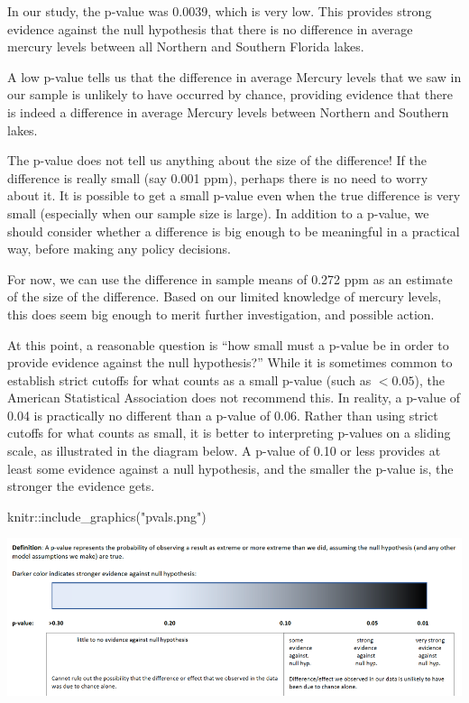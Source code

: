 \documentclass[
  letterpaper,
  DIV=11,
  numbers=noendperiod]{scrreprt}
\newenvironment{Shaded}{\begin{snugshade}}{\end{snugshade}}
\newcommand{\FunctionTok}[1]{\textcolor[rgb]{0.28,0.35,0.67}{#1}}
\newcommand{\NormalTok}[1]{\textcolor[rgb]{0.00,0.23,0.31}{#1}}
\newcommand{\SpecialCharTok}[1]{\textcolor[rgb]{0.37,0.37,0.37}{#1}}
\newcommand{\StringTok}[1]{\textcolor[rgb]{0.13,0.47,0.30}{#1}}
\begin{document}
In our study, the p-value was 0.0039, which is very low. This provides
strong evidence against the null hypothesis that there is no difference
in average mercury levels between all Northern and Southern Florida
lakes.

A low p-value tells us that the difference in average Mercury levels
that we saw in our sample is unlikely to have occurred by chance,
providing evidence that there is indeed a difference in average Mercury
levels between Northern and Southern lakes.

The p-value does not tell us anything about the size of the difference!
If the difference is really small (say 0.001 ppm), perhaps there is no
need to worry about it. It is possible to get a small p-value even when
the true difference is very small (especially when our sample size is
large). In addition to a p-value, we should consider whether a
difference is big enough to be meaningful in a practical way, before
making any policy decisions.

For now, we can use the difference in sample means of 0.272 ppm as an
estimate of the size of the difference. Based on our limited knowledge
of mercury levels, this does seem big enough to merit further
investigation, and possible action.

At this point, a reasonable question is ``how small must a p-value be in
order to provide evidence against the null hypothesis?'' While it is
sometimes common to establish strict cutoffs for what counts as a small
p-value (such as \(<0.05\)), the American Statistical Association does
not recommend this. In reality, a p-value of 0.04 is practically no
different than a p-value of 0.06. Rather than using strict cutoffs for
what counts as small, it is better to interpreting p-values on a sliding
scale, as illustrated in the diagram below. A p-value of 0.10 or less
provides at least some evidence against a null hypothesis, and the
smaller the p-value is, the stronger the evidence gets.

\begin{Shaded}
\begin{Highlighting}[]
\NormalTok{knitr}\SpecialCharTok{::}\FunctionTok{include\_graphics}\NormalTok{(}\StringTok{"pvals.png"}\NormalTok{)}
\end{Highlighting}
\end{Shaded}

\includegraphics[width=1\textwidth,height=\textheight]{pvals.png}
\end{document}
